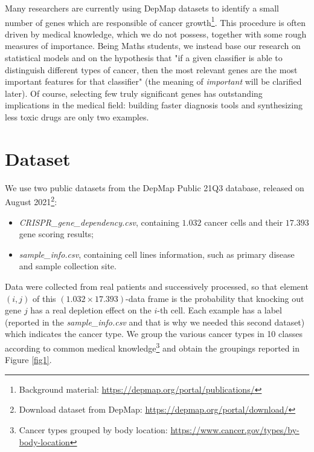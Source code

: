 \documentclass[a4paper,11pt, oneside]{article}  %
\begin{document}
Many researchers are currently using DepMap datasets to identify a small number of genes which are responsible of cancer growth\footnote{Background material: \url{https://depmap.org/portal/publications/}}. This procedure is often driven by medical knowledge,  which we do not possess,  together with some rough measures of importance.  Being Maths students, we instead base our research on statistical models and on the hypothesis that "if a given classifier is able to distinguish different types of cancer,  then the most relevant genes are the most important features for that classifier" (the meaning of \textit{important} will be clarified later).  Of course,  selecting few truly significant genes has outstanding implications in the medical field: building faster diagnosis tools and synthesizing less toxic drugs are only two examples. 


\section{Dataset}
We use two public datasets from the DepMap Public 21Q3 database,  released on August 2021\footnote{Download dataset from DepMap:  \url{https://depmap.org/portal/download/}}:
\begin{itemize}
	\item \textit{CRISPR\_gene\_dependency.csv}, containing $1.032$ cancer cells and their $17.393$ gene scoring results;
	\item \textit{sample\_info.csv}, containing cell lines information,  such as primary disease and sample collection site.
\end{itemize}
Data were collected from real patients and successively processed,  so that element $(i, j)$ of this $(1.032 \times 17.393)$-data frame is the probability that knocking out gene $j$ has a real depletion effect on the $i$-th cell.  Each example has a label (reported in the \textit{sample\_info.csv} and that is why we needed this second dataset) which indicates the cancer type.  We group the various cancer types in 10 classes according to common medical knowledge\footnote{Cancer types grouped by body location: \url{https://www.cancer.gov/types/by-body-location}} and obtain the groupings reported in Figure \ref{fig1}. 
\end{document}
